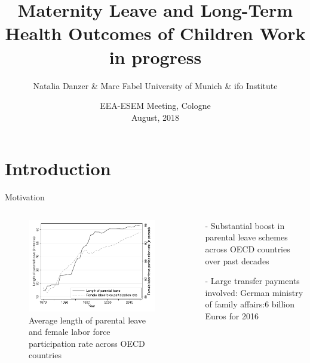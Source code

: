 \documentclass[usenames,dvipsnames]{beamer} %
\title[Maternity leave and long-run child health]{  \textbf{Maternity Leave and Long-Term Health Outcomes of Children }\newline Work in progress}
\author[Danzer \& Fabel]{Natalia Danzer \& Marc Fabel \newline University of Munich \& ifo Institute}
\date{EEA-ESEM Meeting, Cologne\\August, 2018}
\begin{document}
\begin{frame}
	\titlepage
\end{frame}



\section{Introduction}
\begin{frame}{Motivation}
\begin{columns}
\begin{column}{.5\textwidth}
\begin{figure}\centering
\includegraphics[width=1\textwidth]{../../analysis/graphs/SOEP/PL_OECD.pdf}
\vspace{-0.9em}
\caption{\tiny Average length of parental leave and female labor force participation rate across OECD countries}
\end{figure}
\end{column}



	\begin{column}{.57\textwidth}
\begin{itemize}
\item[-] Substantial boost in parental leave schemes across OECD countries over past decades
\item[-] Large transfer payments involved: German ministry of family affairs:\newline $6$ billion Euros for 2016 



\end{itemize}
\end{column}
\end{columns}
\end{frame}
\end{document}
